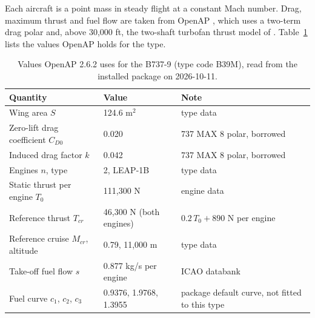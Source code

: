Each aircraft is a point mass in steady flight at a constant Mach number. Drag, maximum thrust and fuel flow are taken from OpenAP \cite{sun2020openap}, which uses a two-term drag polar and, above 30,000 ft, the two-shaft turbofan thrust model of \textcite{bartel2008thrustFuel}. Table~\ref{tab:openap-params} lists the values OpenAP holds for the type.


\begin{table}[h]
\centering
\small
\caption{Values OpenAP 2.6.2 uses for the B737-9 (type code B39M), read from the installed package on 2026-10-11.}
\label{tab:openap-params}
\begin{tabular}{@{}p{5.6cm}p{3.6cm}p{5.6cm}@{}}
\toprule
Quantity & Value & Note \\
\midrule
Wing area $S$ & 124.6 m$^2$ & type data \\
Zero-lift drag coefficient $C_{D0}$ & 0.020 & 737 MAX 8 polar, borrowed \\
Induced drag factor $k$ & 0.042 & 737 MAX 8 polar, borrowed \\
Engines $n$, type & 2, LEAP-1B & type data \\
Static thrust per engine $T_0$ & 111,300 N & engine data \\
Reference thrust $T_{cr}$ & 46,300 N (both engines) & $0.2\,T_0 + 890$ N per engine \\
Reference cruise $M_{cr}$, altitude & 0.79, 11,000 m & type data \\
Take-off fuel flow $s$ & 0.877 kg/s per engine & ICAO databank \\
Fuel curve $c_1$, $c_2$, $c_3$ & 0.9376, 1.9768, 1.3955 & package default curve, not fitted to this type \\
\bottomrule
\end{tabular}
\end{table}

